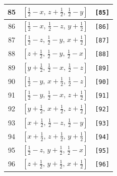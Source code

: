 \documentclass[fleqn,8pt]{jsarticle}
\begin{document}
\begin{longtable}{ccc}
85 & $\left[ \frac{1}{2} - x,\, z + \frac{1}{2},\, \frac{1}{2} - y \right]$ & {\tt [85]} \\ \hline
86 & $\left[ \frac{1}{2} - x,\, \frac{1}{2} - z,\, y + \frac{1}{2} \right]$ & {\tt [86]} \\ \hline
87 & $\left[ \frac{1}{2} - z,\, \frac{1}{2} - y,\, x + \frac{1}{2} \right]$ & {\tt [87]} \\ \hline
88 & $\left[ z + \frac{1}{2},\, \frac{1}{2} - y,\, \frac{1}{2} - x \right]$ & {\tt [88]} \\ \hline
89 & $\left[ y + \frac{1}{2},\, \frac{1}{2} - x,\, \frac{1}{2} - z \right]$ & {\tt [89]} \\ \hline
90 & $\left[ \frac{1}{2} - y,\, x + \frac{1}{2},\, \frac{1}{2} - z \right]$ & {\tt [90]} \\ \hline
91 & $\left[ \frac{1}{2} - y,\, \frac{1}{2} - x,\, z + \frac{1}{2} \right]$ & {\tt [91]} \\ \hline
92 & $\left[ y + \frac{1}{2},\, x + \frac{1}{2},\, z + \frac{1}{2} \right]$ & {\tt [92]} \\ \hline
93 & $\left[ x + \frac{1}{2},\, \frac{1}{2} - z,\, \frac{1}{2} - y \right]$ & {\tt [93]} \\ \hline
94 & $\left[ x + \frac{1}{2},\, z + \frac{1}{2},\, y + \frac{1}{2} \right]$ & {\tt [94]} \\ \hline
95 & $\left[ \frac{1}{2} - z,\, y + \frac{1}{2},\, \frac{1}{2} - x \right]$ & {\tt [95]} \\ \hline
96 & $\left[ z + \frac{1}{2},\, y + \frac{1}{2},\, x + \frac{1}{2} \right]$ & {\tt [96]} \\
\end{longtable}
\end{document}
